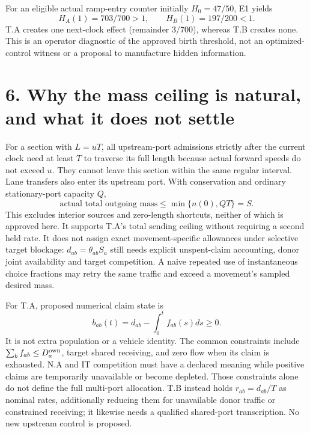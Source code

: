 \documentclass[11pt,a4paper]{article}
\begin{document}
For an eligible actual ramp-entry counter initially $H_0=47/50$, E1 yields
\begin{equation}
 H_A(1)=703/700>1,\qquad H_B(1)=197/200<1.
\end{equation}
T.A creates one next-clock effect (remainder $3/700$), whereas T.B creates
none. This is an operator diagnostic of the approved birth threshold, not
an optimized-control witness or a proposal to manufacture hidden information.

\newpage
\section*{6. Why the mass ceiling is natural, and what it does not settle}
For a section with $L=uT$, all upstream-port admissions strictly after the
current clock need at least $T$ to traverse its full length because actual
forward speeds do not exceed $u$. They cannot leave this section within the
same regular interval. Lane transfers also enter its upstream port. With
conservation and ordinary stationary-port capacity $Q$,
\begin{equation}
 \text{actual total outgoing mass}\le \min\{n(0),QT\}=S.
\end{equation}
This excludes interior sources and zero-length shortcuts, neither of which
is approved here. It supports T.A's total sending ceiling without requiring
a second held rate. It does not assign exact movement-specific allowances
under selective target blockage: $d_{ab}=\theta_{ab}S_a$ still needs
explicit unspent-claim accounting, donor joint availability and target
competition. A naive repeated use of instantaneous choice fractions may
retry the same traffic and exceed a movement's sampled desired mass.

For T.A, proposed numerical claim state is
\begin{equation}
 b_{ab}(t)=d_{ab}-\int_0^t f_{ab}(s)ds\ge0.
\end{equation}
It is not extra population or a vehicle identity. The common constraints
include $\sum_b f_{ab}\le D_a^{\rm own}$, target shared receiving, and zero
flow when its claim is exhausted. N.A and IT competition must have a declared
meaning while positive claims are temporarily unavailable or become depleted.
Those constraints alone do not define the full multi-port allocation. T.B
instead holds $r_{ab}=d_{ab}/T$ as nominal rates, additionally reducing them
for unavailable donor traffic or constrained receiving; it likewise needs a
qualified shared-port transcription. No new upstream control is proposed.
\end{document}

